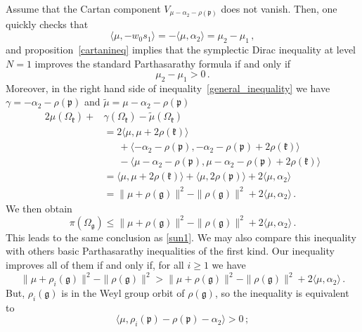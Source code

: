 \documentclass{amsart}[draft,11pt]
\newcommand{\fg}{{\mathfrak{g}}}
\newcommand{\fk}{{\mathfrak{k}}}
\newcommand{\fp}{{\mathfrak{p}}}
\numberwithin{equation}{section}
\theoremstyle{definition}
\begin{document}
Assume that the Cartan component $V_{\mu-\alpha_2-\rho(\fp)}$ does not vanish. Then, one quickly checks that 
$$
\langle \mu,-w_0s_1\rangle 
=-\langle \mu,\alpha_2\rangle = \mu_2-\mu_1 \,,
$$
and proposition~\ref{cartanineq} implies that the symplectic Dirac inequality at level $N=1$ improves the standard
Parthasarathy formula if and only if \begin{equation}
\label{sun1}
    \mu_2-\mu_1 > 0\,.
\end{equation} 
Moreover, in
the right hand side of inequality~\eqref{general_inequality} we have
$\gamma=-\alpha_2-\rho(\fp)$ and $\tilde{\mu}=\mu-\alpha_2-\rho(\fp)$
\begin{align*}
    2\mu(\Omega_\fk)+
    &\gamma(\Omega_\fk)-\tilde{\mu}(\Omega_\fk) \\
    &=2\langle \mu,\mu+2\rho(\fk)\rangle \\
    &\phantom{2\langle\mu}+
    \langle -\alpha_2-\rho(\fp),
    -\alpha_2-\rho(\fp)+2\rho(\fk) \rangle \\
    &\phantom{2\langle\mu}-
    \langle \mu-\alpha_2-\rho(\fp),
    \mu-\alpha_2-\rho(\fp)+2\rho(\fk) \rangle \\
    &=\langle \mu,\mu+2\rho(\fk)\rangle +
    \langle \mu,2\rho(\fp)\rangle 
    +2\langle\mu,\alpha_2 \rangle\\
    &=\|\mu+\rho(\fg)\|^2-
    \|\rho(\fg)\|^2 
    +2\langle\mu,\alpha_2 \rangle\,.
\end{align*}
We then obtain
\begin{equation}
    \label{cartan_level1}
    \pi(\Omega_\fg)\leq \|\mu+\rho(\fg)\|^2-
    \|\rho(\fg)\|^2 +2\langle\mu,\alpha_2 \rangle \,.
\end{equation}
This leads to the same conclusion as \eqref{sun1}.
We may also compare this inequality with others basic Parthasarathy inequalities of the first kind. Our inequality improves all of them if and only if,
for all $i\geq 1$ we have
$$
\|\mu+\rho_i(\fg)\|^2-
    \|\rho(\fg)\|^2 > 
\|\mu+\rho(\fg)\|^2-
    \|\rho(\fg)\|^2 +2\langle\mu,\alpha_2 \rangle \,.
$$
But, $\rho_i(\fg)$ is in the Weyl group orbit of $\rho(\fg)$, so the inequality is equivalent to
$$
\langle \mu, \rho_i(\fp)-\rho(\fp)-\alpha_2\rangle >0 \,;
$$
\end{document}
